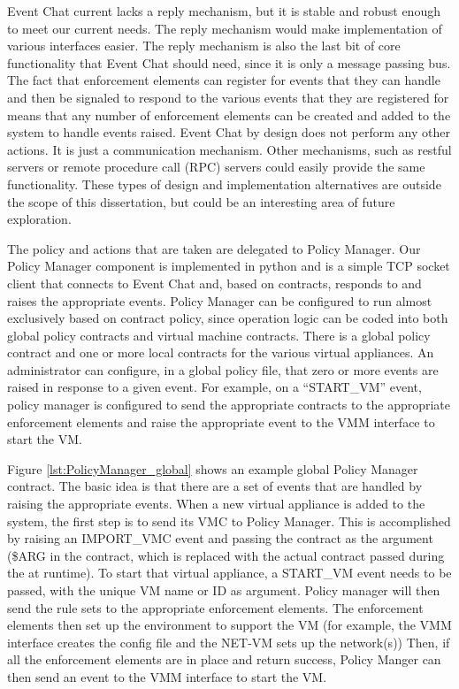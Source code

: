 Event Chat current lacks a reply mechanism, but it is stable and robust enough to meet our current needs. The reply mechanism would make implementation of various interfaces easier. The reply mechanism is also the last bit of core functionality that Event Chat should need, since it is only a message passing bus. The fact that enforcement elements can register for events that they can handle and then be signaled to respond to the various events that they are registered for means that any number of enforcement elements can be created and added to the system to handle events raised. Event Chat by design does not perform any other actions. It is just a communication mechanism. Other mechanisms, such as restful servers\cite{restful_phdthesis} or remote procedure call (RPC) servers could easily provide the same functionality. These types of design and implementation alternatives are outside the scope of this dissertation, but could be an interesting area of future exploration.

The policy and actions that are taken are delegated to Policy Manager. Our Policy Manager component is implemented in python and is a simple TCP socket client that connects to Event Chat and, based on contracts, responds to and raises the appropriate events. Policy Manager can be configured to run almost exclusively based on contract policy, since operation logic can be coded into both global policy contracts and virtual machine contracts. There is a global policy contract and one or more local contracts for the various virtual appliances. An administrator can configure, in a global policy file, that zero or more events are raised in response to a given event. For example, on a ``START\_VM'' event, policy manager is configured to send the appropriate contracts to the appropriate enforcement elements and raise the appropriate event to the VMM interface to start the VM. 

Figure \ref{lst:PolicyManager_global} shows an example global Policy Manager contract. The basic idea is that there are a set of events that are handled by raising the appropriate events. When a new virtual appliance is added to the system, the first step is to send its VMC to Policy Manager. This is accomplished by raising an IMPORT\_VMC event and passing the contract as the argument (\$ARG in the contract, which is replaced with the actual contract passed during the at runtime). To start that virtual appliance, a START\_VM event needs to be passed, with the unique VM name or ID as argument. Policy manager will then send the rule sets to the appropriate enforcement elements. The enforcement elements then set up the environment to support the VM (for example, the VMM interface creates the config file and the NET-VM sets up the network(s)) Then, if all the enforcement elements are in place and return success, Policy Manger can then send an event to the VMM interface to start the VM. 

